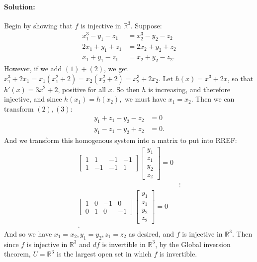 \documentclass{article}
\begin{document}
\begin{enumerate}
\begin{enumerate}[label= (\alph*)]
        \paragraph{Solution: }Begin by showing that $f$ is injective in $\mathbb{R}^3$. Suppose:
        \begin{align*}
            x_1^3-y_1-z_1&=x_2^3-y_2-z_2\tag{1}\\
            2x_1+y_1+z_1&=2x_2+y_2+z_2\tag{2}\\
            x_1+y_1-z_1&=x_2+y_2-z_2\tag{3}
        .\end{align*}
        However, if we add $(1)+(2)$, we get $x_1^3+2x_1=x_1(x_1^2+2)=x_2(x_2^2+2)=x_2^3+2x_2$.
        Let $h(x)=x^3+2x$, so that $h'(x)=3x^2+2$, positive for all $x$. So then $h$ is increasing, and therefore injective, and since  $h(x_1)=h(x_2),$ we must have $x_1=x_2$. Then we can transform $(2),(3):$ 
         \begin{align*}
            y_1+z_1-y_2-z_2&= 0 \\
            y_1-z_1-y_2+z_2&= 0 
        .\end{align*}
        And we transform this homogenous system into a matrix to put into RREF:
        \begin{align*}
            \begin{bmatrix}1&1&-1&-1\\
                1&-1&-1&1\end{bmatrix}\begin{bmatrix} y_1\\z_1\\y_2\\z_2\end{bmatrix}=0\\
                 &\vdots\\
            \begin{bmatrix}1&0&-1&0\\
                0&1&0&-1\end{bmatrix}
                \begin{bmatrix} y_1\\z_1\\y_2\\z_2\end{bmatrix}=0\\
        .\end{align*}
        And so we have $x_1=x_2,y_1=y_2,z_1=z_2$ as desired, and $f$ is injective in $\mathbb{R}^3$. Then since $f$ is injective in $\mathbb{R}^3$ and $df$ is invertible in $\mathbb{R}^3$, by the Global inversion theorem, $U=\mathbb{R}^3$ is the largest open set in which $f$ is invertible.


\end{enumerate}
\end{enumerate}
\end{document}
